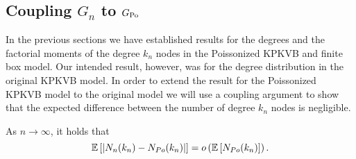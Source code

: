 \subsection{Coupling $G_n$ to $G_{{\mathrm{Po}}}$}\label{ssec:coupling_Gn_GPo}

In the previous sections we have established results for the degrees and the factorial moments of the degree $k_n$ nodes in the Poissonized KPKVB and finite box model. Our intended result, however, was for the degree distribution in the original KPKVB model. In order to extend the result for the Poissonized KPKVB model to the original model we will use a coupling argument to show that the expected difference between the number of degree $k_n$ nodes is negligible.

\begin{lemma}\label{lem:diff_Nk_hyperbolic_binomial_poisson}
As $n \rightarrow \infty$, it holds that
\[
\mathbb{E}\left[\left|N_{n}(k_n)-N_{Po}(k_n)\right|\right] = o\left(\mathbb{E}\left[N_{Po}(k_n)\right]\right).
\]
\end{lemma}

